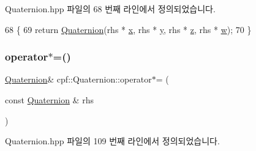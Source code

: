 Quaternion.\+hpp 파일의 68 번째 라인에서 정의되었습니다.


\begin{DoxyCode}
68                                               \{
69             \textcolor{keywordflow}{return} \hyperlink{classcpf_1_1_quaternion_aae3cc98fcdb7a419a29db4ee988972bc}{Quaternion}(rhs * \hyperlink{classcpf_1_1_quaternion_a200f7bce4e673281af8cc7dd75cb0677}{x}, rhs * \hyperlink{classcpf_1_1_quaternion_a4fbade6e58be55a49c94e7f157988136}{y}, rhs * \hyperlink{classcpf_1_1_quaternion_ade9c41b717605118e5fdf95d96a843b4}{z}, rhs * \hyperlink{classcpf_1_1_quaternion_af312a196b39bb4903b876bc454ac15f8}{w});
70         \}
\end{DoxyCode}
\mbox{\label{classcpf_1_1_quaternion_a7dde75afc2e3e840efcd7cd782929c3e}} 
\subsubsection{\texorpdfstring{operator$\ast$=()}{operator*=()}}
{\footnotesize\ttfamily \hyperlink{classcpf_1_1_quaternion}{Quaternion}\& cpf\+::\+Quaternion\+::operator$\ast$= (\begin{DoxyParamCaption}\item[{const \hyperlink{classcpf_1_1_quaternion}{Quaternion} \&}]{rhs }\end{DoxyParamCaption})\hspace{0.3cm}{\ttfamily [inline]}}



Quaternion.\+hpp 파일의 109 번째 라인에서 정의되었습니다.



